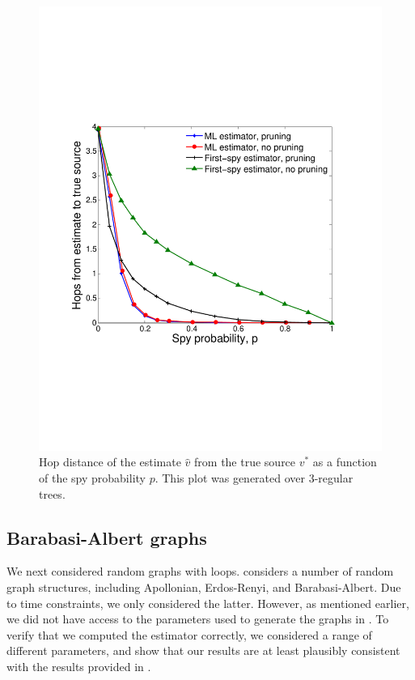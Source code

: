\begin{figure}
\begin{minipage}[c]{0.49\linewidth}
    \includegraphics[width=0.9\linewidth]{figures/hops_vs_spies}
    \caption{Hop distance of the estimate $\hat v$ from the true source $v^*$ as a function of the spy probability $p$. This plot was generated over 3-regular trees. %
    }
    \label{fig:hops_vs_spies}
  \end{minipage}
\end{figure}

\subsection{Barabasi-Albert graphs}
We next considered random graphs with loops. \cite{pinto} considers a number of random graph structures, including Apollonian, Erdos-Renyi, and Barabasi-Albert. Due to time constraints, we only considered the latter. However, as mentioned earlier, we did not have access to the parameters used to generate the graphs in \cite{pinto}. To verify that we computed the estimator correctly, we considered a range of different parameters, and show that our results are at least plausibly consistent with the results provided in \cite{pinto}.


